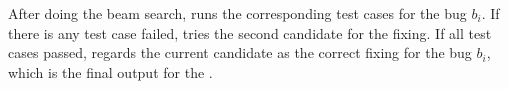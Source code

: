 After doing the beam search, \tool runs the corresponding test cases for the bug $b_i$. If there is any test case failed, \tool tries the second candidate for the fixing. If all test cases passed, \tool regards the current candidate as the correct fixing for the bug $b_i$, which is the final output for the \tool.
